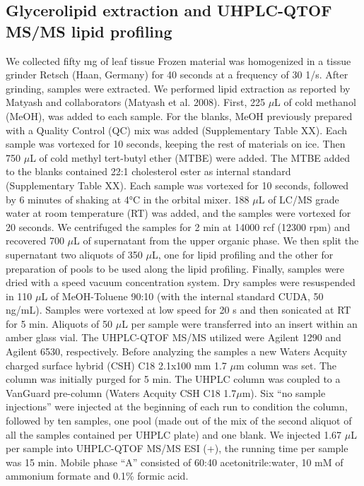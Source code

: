 \documentclass[9pt,twocolumn,twoside,lineno]{gsajnl}
\begin{document}
\subsection{Glycerolipid extraction and UHPLC-QTOF MS/MS lipid profiling} 
We collected fifty mg of leaf tissue  Frozen material was homogenized in a tissue grinder Retsch (Haan, Germany) for 40 seconds at a frequency of 30 1/s. After grinding, samples were extracted. 
We performed lipid extraction as reported by Matyash and collaborators (Matyash et al. 2008). 
First, 225 $\mu$L of cold methanol (MeOH), was added to each sample. 
For the blanks, MeOH previously prepared with a Quality Control (QC) mix was added (Supplementary Table XX). Each sample was vortexed for 10 seconds, keeping the rest of materials on ice. 
Then 750 $\mu$L of cold methyl tert-butyl ether (MTBE) were added. The MTBE added to the blanks contained 22:1 cholesterol ester as internal standard (Supplementary Table XX). 
Each sample was vortexed for 10 seconds, followed by 6 minutes of shaking at 4°C in the orbital mixer. 
188 $\mu$L of LC/MS grade water at room temperature (RT) was added, and the samples were vortexed for 20 seconds.
We centrifuged the samples for 2 min at 14000 rcf (12300 rpm) and recovered 700 $\mu$L of supernatant from the upper organic phase. 
We then split the supernatant two aliquots of 350 $\mu$L, one for lipid profiling and the other for preparation of pools to be used along the lipid profiling. 
Finally, samples were dried with a speed vacuum concentration system.
Dry samples were resuspended in 110 $\mu$L of MeOH-Toluene 90:10 (with the internal standard CUDA, 50 ng/mL). 
Samples were vortexed at low speed for 20 s and then sonicated at RT for 5 min. 
Aliquots of 50 $\mu$L per sample were transferred into an insert within an amber glass vial.
The UHPLC-QTOF MS/MS utilized were Agilent 1290 and Agilent 6530, respectively. 
Before analyzing the samples a new Waters Acquity charged surface hybrid (CSH) C18 2.1x100 mm 1.7 $\mu$m column was set. 
The column was initially purged for 5 min. 
The UHPLC column was coupled to a VanGuard pre-column (Waters Acquity CSH C18 1.7$\mu$m). 
Six “no sample injections” were injected at the beginning of each run to condition the column, followed by ten samples, one pool (made out of the mix of the second aliquot of all the samples contained per UHPLC plate) and one blank.
We injected 1.67 $\mu$L per sample into UHPLC-QTOF MS/MS ESI (+), the running time per sample was 15 min. Mobile phase “A” consisted of 60:40 acetonitrile:water, 10 mM of ammonium formate and 0.1\% formic acid. 
\end{document}
